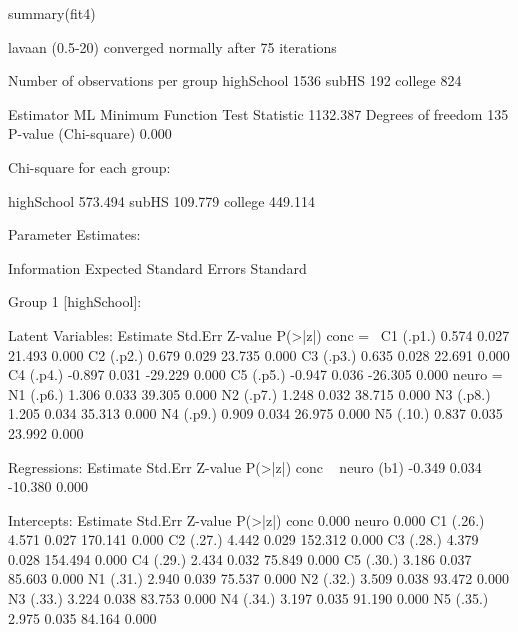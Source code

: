 \begin{Schunk}
\begin{Sinput}
 summary(fit4)
\end{Sinput}
\begin{Soutput}
lavaan (0.5-20) converged normally after  75 iterations

  Number of observations per group         
  highSchool                                      1536
  subHS                                            192
  college                                          824

  Estimator                                         ML
  Minimum Function Test Statistic             1132.387
  Degrees of freedom                               135
  P-value (Chi-square)                           0.000

Chi-square for each group:

  highSchool                                   573.494
  subHS                                        109.779
  college                                      449.114

Parameter Estimates:

  Information                                 Expected
  Standard Errors                             Standard


Group 1 [highSchool]:

Latent Variables:
                   Estimate  Std.Err  Z-value  P(>|z|)
  conc =~                                             
    C1      (.p1.)    0.574    0.027   21.493    0.000
    C2      (.p2.)    0.679    0.029   23.735    0.000
    C3      (.p3.)    0.635    0.028   22.691    0.000
    C4      (.p4.)   -0.897    0.031  -29.229    0.000
    C5      (.p5.)   -0.947    0.036  -26.305    0.000
  neuro =~                                            
    N1      (.p6.)    1.306    0.033   39.305    0.000
    N2      (.p7.)    1.248    0.032   38.715    0.000
    N3      (.p8.)    1.205    0.034   35.313    0.000
    N4      (.p9.)    0.909    0.034   26.975    0.000
    N5      (.10.)    0.837    0.035   23.992    0.000

Regressions:
                   Estimate  Std.Err  Z-value  P(>|z|)
  conc ~                                              
    neuro     (b1)   -0.349    0.034  -10.380    0.000

Intercepts:
                   Estimate  Std.Err  Z-value  P(>|z|)
    conc              0.000                           
    neuro             0.000                           
    C1      (.26.)    4.571    0.027  170.141    0.000
    C2      (.27.)    4.442    0.029  152.312    0.000
    C3      (.28.)    4.379    0.028  154.494    0.000
    C4      (.29.)    2.434    0.032   75.849    0.000
    C5      (.30.)    3.186    0.037   85.603    0.000
    N1      (.31.)    2.940    0.039   75.537    0.000
    N2      (.32.)    3.509    0.038   93.472    0.000
    N3      (.33.)    3.224    0.038   83.753    0.000
    N4      (.34.)    3.197    0.035   91.190    0.000
    N5      (.35.)    2.975    0.035   84.164    0.000


\end{Soutput}
\end{Schunk}
